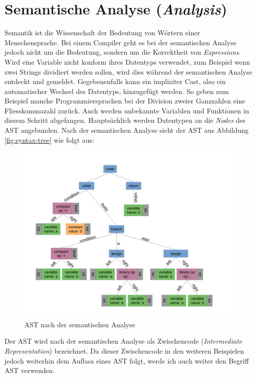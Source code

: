 \section{Semantische Analyse (\textit{Analysis})}
Semantik ist die Wissenschaft der Bedeutung von Wörtern einer Menschensprache. Bei einem Compiler geht es bei der semantischen Analyse jedoch nicht um die Bedeutung, sondern um die Korrektheit von \textit{Expressions}.
Wird eine Variable nicht konform ihres Datentyps verwendet, zum Beispiel wenn zwei Strings dividiert werden sollen, wird dies während der semantischen Analyse entdeckt und gemeldet.
Gegebenenfalls kann ein impliziter Cast, also ein automatischer Wechsel des Datentyps, hinzugefügt werden.
So geben zum Beispiel manche Programmiersprachen bei der Division zweier Ganzzahlen eine Fliesskommazahl zurück.
Auch werden unbekannte Variablen und Funktionen in diesem Schritt abgefangen.
Hauptsächlich werden Datentypen an die \textit{Nodes} des AST angebunden. Nach der semantischen Analyse sieht der AST aus Abbildung \ref{fig:syntax-tree} wie folgt aus:

\begin{figure}[H]
    \centering
    \includegraphics[scale=0.4]{resources/images/AST_with_types.pdf}
    \caption[AST nach der semantischen Analyse (Basierend auf Abbildung \ref{fig:syntax-tree})]{AST nach der semantischen Analyse}
    \label{fig:syntax-tree-with-types}
\end{figure}

Der AST wird nach der semantischen Analyse als Zwischencode (\textit{Intermediate Representation}) bezeichnet.
Da dieser Zwischencode in den weiteren Beispielen jedoch weiterhin dem Aufbau eines AST folgt, werde ich auch weiter den Begriff AST verwenden.



